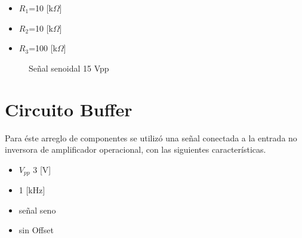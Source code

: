 \documentclass{article}
\begin{document}
\begin{itemize}
    \item $R_1$=10 [k$\Omega$]
     \item $R_2$=10 [k$\Omega$]
      \item $R_3$=100 [k$\Omega$]
\end{itemize}



\begin{figure}
    \centering
    
   

 \caption{Señal senoidal 15 Vpp}
    \label{fig:seno15Vpp}
\end{figure}


\section{Circuito Buffer}

Para éste arreglo de componentes se utilizó una señal conectada a la entrada no inversora de amplificador operacional, con las siguientes características.\\

\begin{itemize}
    \item $V_{pp}$ 3 [V]
    \item 1 [kHz]
    \item señal seno
    \item sin Offset
\end{itemize}
\end{document}
